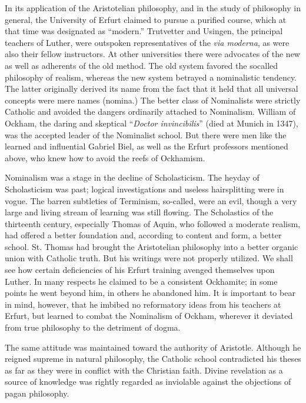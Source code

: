 In its application of the Aristotelian philosophy, and in the study
of philosophy in general, the University of Erfurt claimed to pursue
a purified course, which at that time was designated as “modern.”
Trutvetter and Usingen, the principal teachers of Luther, were outspoken
representatives of the \textit{via moderna}, as were also their fellow
instructors. At other universities there were advocates of the new as
well as adherents of the old method. The old system favored the socalled
philosophy of realism, whereas the new system betrayed
a nominalistic tendency. The latter originally derived its name
from the fact that it held that all universal concepts were mere
names (nomina.) The better class of Nominalists were strictly Catholic
and avoided the dangers ordinarily attached to Nominalism. William
of Ockham, the daring and skeptical “\textit{Doctor invincibilis}” (died
at Munich in 1347), was the accepted leader of the Nominalist school.
But there were men like the learned and influential Gabriel Biel, as
well as the Erfurt professors mentioned above, who knew how to
avoid the reefs of Ockhamism.

Nominalism was a stage in the decline of Scholasticism. The heyday
of Scholasticism was past; logical investigations and useless hairsplitting
were in vogue. The barren subtleties of Terminism, so-called,
were an evil, though a very large and living stream of learning was
still flowing. The Scholastics of the thirteenth century, especially
Thomas of Aquin, who followed a moderate realism, had offered a
better foundation and, according to content and form, a better
school. St. Thomas had brought the Aristotelian philosophy into a
better organic union with Catholic truth. But his writings were not
properly utilized. We shall see how certain deficiencies of his Erfurt
training avenged themselves upon Luther. In many respects he
claimed to be a consistent Ockhamite; in some points he went beyond
him, in others he abandoned him. It is important to bear in
mind, however, that he imbibed no reformatory ideas from his
teachers at Erfurt, but learned to combat the Nominalism of Ockham,
wherever it deviated from true philosophy to the detriment of
dogma.

The same attitude was maintained toward the authority of Aristotle.
Although he reigned supreme in natural philosophy, the Catholic
school contradicted his theses as far as they were in conflict with
the Christian faith. Divine revelation as a source of knowledge was
rightly regarded as inviolable against the objections of pagan philosophy.

